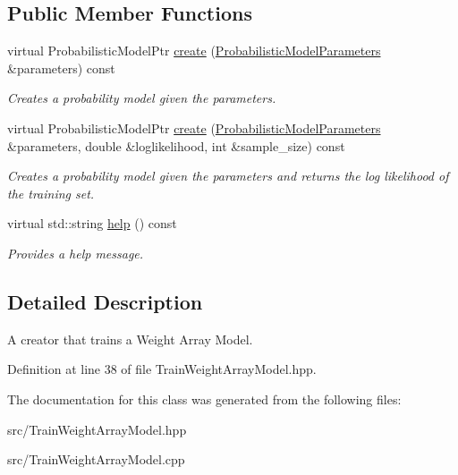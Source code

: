 \subsection*{Public Member Functions}
\begin{DoxyCompactItemize}
\item 
\mbox{\label{classtops_1_1TrainWeightArrayModel_a7494fc0ad9ab876be3dd0ebee7613206}} 
virtual Probabilistic\+Model\+Ptr \hyperlink{classtops_1_1TrainWeightArrayModel_a7494fc0ad9ab876be3dd0ebee7613206}{create} (\hyperlink{classtops_1_1ProbabilisticModelParameters}{Probabilistic\+Model\+Parameters} \&parameters) const
\begin{DoxyCompactList}\small\item\em Creates a probability model given the parameters. \end{DoxyCompactList}\item 
\mbox{\label{classtops_1_1TrainWeightArrayModel_aa1f3fca3d02d74028c090a4847837174}} 
virtual Probabilistic\+Model\+Ptr \hyperlink{classtops_1_1TrainWeightArrayModel_aa1f3fca3d02d74028c090a4847837174}{create} (\hyperlink{classtops_1_1ProbabilisticModelParameters}{Probabilistic\+Model\+Parameters} \&parameters, double \&loglikelihood, int \&sample\+\_\+size) const
\begin{DoxyCompactList}\small\item\em Creates a probability model given the parameters and returns the log likelihood of the training set. \end{DoxyCompactList}\item 
\mbox{\label{classtops_1_1TrainWeightArrayModel_a6d2f5e27d903bbcbe34b0f21aee56ad9}} 
virtual std\+::string \hyperlink{classtops_1_1TrainWeightArrayModel_a6d2f5e27d903bbcbe34b0f21aee56ad9}{help} () const
\begin{DoxyCompactList}\small\item\em Provides a help message. \end{DoxyCompactList}\end{DoxyCompactItemize}


\subsection{Detailed Description}
A creator that trains a Weight Array Model. 

Definition at line 38 of file Train\+Weight\+Array\+Model.\+hpp.



The documentation for this class was generated from the following files\+:\begin{DoxyCompactItemize}
\item 
src/Train\+Weight\+Array\+Model.\+hpp\item 
src/Train\+Weight\+Array\+Model.\+cpp\end{DoxyCompactItemize}

